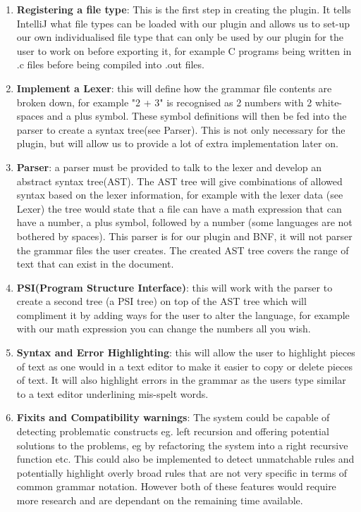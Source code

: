\documentclass{l3proj}
\begin{document}
\begin{enumerate}
	\item \textbf{Registering a file type}: This is the first step in creating the plugin. It tells IntelliJ what file types can be loaded with our plugin and allows us to set-up our own individualised file type that can only be used by our plugin for the user to work on before exporting it, for example C programs being written in .c files before being compiled into .out files.
	\item \textbf{Implement a Lexer}: this will define how the grammar file contents are broken down, for example "2 + 3" is recognised as 2 numbers with 2 white-spaces and a plus symbol. These symbol definitions will then be fed into the parser to create a syntax tree(see Parser). This is not only necessary for the plugin, but will allow us to provide a lot of extra implementation later on.
	\item \textbf{Parser}: a parser must be provided to talk to the lexer and develop an abstract syntax tree(AST). The AST tree will give combinations of allowed syntax based on the lexer information, for example with the lexer data (see Lexer) the tree would state that a file can have a math expression that can have a number, a plus symbol, followed by a number (some languages are not bothered by spaces). This parser is for our plugin and BNF, it will not parser the grammar files the user creates. The created AST tree covers the range of text that can exist in the document.
	\item \textbf{PSI(Program Structure Interface)}: this will work with the parser to create a second tree (a PSI tree) on top of the AST tree which will compliment it by adding ways for the user to alter the language, for example with our math expression you can change the numbers all you wish. 
	\item \textbf{Syntax and Error Highlighting}: this will allow the user to highlight pieces of text as one would in a text editor to make it easier to copy or delete pieces of text. It will also highlight errors in the grammar as the users type similar to a text editor underlining mis-spelt words.
	\item \textbf{Fixits and Compatibility warnings}: The system could be capable of detecting problematic constructs eg. left recursion and offering potential solutions to the problems, eg by refactoring the system into a right recursive function etc. This could also be implemented to detect unmatchable rules and potentially highlight overly broad rules that are not very specific in terms of common grammar notation. However both of these features would require more research and are dependant on the remaining time available. 

\end{enumerate}
\end{document}

